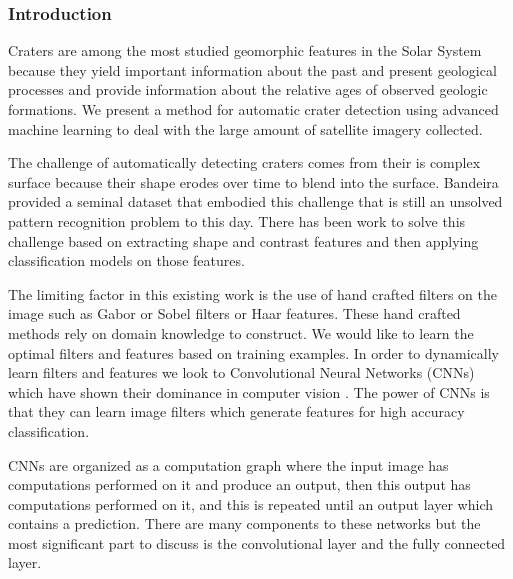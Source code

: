 \documentclass[twoside]{article}
\begin{document}







\subsubsection*{Introduction}
\vspace{-9pt}

Craters are among the most studied geomorphic features in the Solar System because they yield important information about the past and present geological processes and provide information about the relative ages of observed geologic formations.  We present a method for automatic crater detection using advanced machine learning to deal with the large amount of satellite imagery collected.


The challenge of automatically detecting craters comes from their is complex surface because their shape erodes over time to blend into the surface. Bandeira \cite{bandeira_automatic_2010} provided a seminal dataset that embodied this challenge that is still an unsolved pattern recognition problem to this day. There has been work to solve this challenge based on extracting shape \cite{urbach_automatic_2009} and contrast \cite{bandeira_automatic_2010,ding_sub-kilometer_2011} features and then applying classification models on those features. 


The limiting factor in this existing work is the use of hand crafted filters on the image such as Gabor or Sobel filters or Haar features. These hand crafted methods rely on domain knowledge to construct. We would like to learn the optimal filters and features based on training examples. In order to dynamically learn filters and features we look to Convolutional Neural Networks (CNNs) which have shown their dominance in computer vision \cite{krizhevsky_imagenet_2012}. The power of CNNs is that they can learn image filters which generate features for high accuracy classification.

CNNs are organized as a computation graph where the input image has computations performed on it and produce an output, then this output has computations performed on it, and this is repeated until an output layer which contains a prediction. There are many components to these networks but the most significant part to discuss is the convolutional layer and the fully connected layer.
\end{document}
